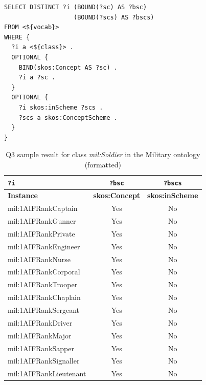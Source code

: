 \begin{lstlisting}[captionpos=b, caption=Q3 -- Query to get a list of candidate code list members and whether they are tagged with \textit{skos:Concept} and \textit{skos:inScheme},label=lst:sparql3,basicstyle=\small\ttfamily,frame=single]
SELECT DISTINCT ?i (BOUND(?sc) AS ?bsc)
                   (BOUND(?scs) AS ?bscs)
FROM <${vocab}>
WHERE {
  ?i a <${class}> .
  OPTIONAL {
    BIND(skos:Concept AS ?sc) .
    ?i a ?sc .
  }
  OPTIONAL {
    ?i skos:inScheme ?scs .
    ?scs a skos:ConceptScheme .
  }
}
\end{lstlisting}

\begin{table}[h]
\footnotesize
\centering
\begin{tabular}{|l|c|c|}
\hline
\textbf{\texttt{?i}}      & \textbf{\texttt{?bsc}} & \textbf{\texttt{?bscs}}      \\ \hline \hline
\textbf{Instance}         & \textbf{skos:Concept}  & \textbf{skos:inScheme}       \\ \hline
mil:1AIFRankCaptain       & Yes                    & No                           \\ \hline
mil:1AIFRankGunner        & Yes                    & No                           \\ \hline
mil:1AIFRankPrivate       & Yes                    & No                           \\ \hline
mil:1AIFRankEngineer      & Yes                    & No                           \\ \hline
mil:1AIFRankNurse         & Yes                    & No                           \\ \hline
mil:1AIFRankCorporal      & Yes                    & No                           \\ \hline
mil:1AIFRankTrooper       & Yes                    & No                           \\ \hline
mil:1AIFRankChaplain      & Yes                    & No                           \\ \hline
mil:1AIFRankSergeant      & Yes                    & No                           \\ \hline
mil:1AIFRankDriver        & Yes                    & No                           \\ \hline
mil:1AIFRankMajor         & Yes                    & No                           \\ \hline
mil:1AIFRankSapper        & Yes                    & No                           \\ \hline
mil:1AIFRankSignaller     & Yes                    & No                           \\ \hline
mil:1AIFRankLieutenant    & Yes                    & No                           \\ \hline
\end{tabular}
\caption{Q3 sample result for class \textit{mil:Soldier} in the Military ontology (formatted)} \label{tab:q3-results}
\end{table}

